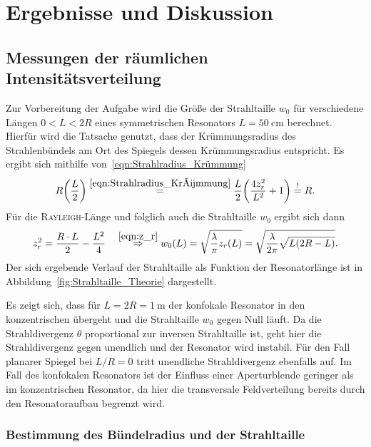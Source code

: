 \documentclass[a4paper,twoside,final]{article}
\begin{document}
\section{Ergebnisse und Diskussion}\label{sec:ErgebnisseUndDiskussion}

\subsection{Messungen der räumlichen Intensitätsverteilung}

Zur Vorbereitung der Aufgabe wird die Größe der Strahltaille $w_0$ für verschiedene Längen $0 < L < 2R$ eines symmetrischen Resonators $L = \SI{50}{\centi\metre}$ berechnet. Hierfür wird die Tatsache genutzt, dass der Krümmungsradius des Strahlenbündels am Ort des Spiegels dessen Krümmungsradius entspricht. Es ergibt sich mithilfe von~\eqref{eqn:Strahlradius_Krümmung}
\begin{align}
  R\qty(\frac{L}{2}) \overset{\eqref{eqn:Strahlradius_Krümmung} }{=} \frac{L}{2} \qty(\frac{4 z_r^2}{L^2} + 1) \overset{!}{=} R.
\end{align}
Für die \textsc{Rayleigh}-Länge und folglich auch die Strahltaille $w_0$ ergibt sich dann
\begin{align}\label{eqn:Strahltaille}
  z_r^2 = \frac{R \cdot L}{2} - \frac{L^2}{4} \quad \overset{\eqref{eqn:z_r}}{\Rightarrow} w_0(L) = \sqrt{\frac{\lambda}{\pi} z_r(L)} = \sqrt{\frac{\lambda}{2\pi}\sqrt{L(2R - L)}}.
\end{align}
Der sich ergebende Verlauf der Strahltaille als Funktion der Resonatorlänge ist in Abbildung~\ref{fig:Strahltaille_Theorie} dargestellt.



Es zeigt sich, dass für $L = 2R = \SI{1}{\metre}$ der konfokale Resonator in den konzentrischen übergeht und die Strahltaille $w_0$ gegen Null läuft. Da die Strahldivergenz $\theta$ proportional zur inversen Strahltaille ist, geht hier die Strahldivergenz gegen unendlich und der Resonator wird instabil. Für den Fall planarer Spiegel bei $L/R = 0$ tritt unendliche Strahldivergenz ebenfalls auf. Im Fall des konfokalen Resonators ist der Einfluss einer Aperturblende geringer als im konzentrischen Resonator, da hier die transversale Feldverteilung bereits durch den Resonatoraufbau begrenzt wird.

\subsubsection{Bestimmung des Bündelradius und der Strahltaille}
\end{document}
